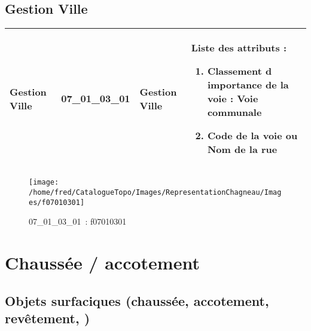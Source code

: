 \documentclass[12pt,titlepage]{book}
\begin{document}
\subsection{Gestion Ville}
\noindent
\vspace{\baselineskip}

\renewcommand{\arraystretch}{1.2}
\begin{supertabular}{|p{10cm}|c|p{13cm}|p{12cm}|}
 Gestion Ville & 07\_01\_03\_01 & Gestion Ville & Liste des attributs :
\begin{enumerate}
  \item Classement d importance de la voie : Voie communale  \item Code de la voie ou Nom de la rue\end{enumerate}
\\
\hline
\end{supertabular}
\begin{figure}[h!]
  \hfill         %
  \begin{minipage}[t]{3cm}
    \begin{center}
      \texttt{[image: /home/fred/CatalogueTopo/Images/RepresentationChagneau/Images/f07010301]}
      \caption[~07\_01\_03\_01]{\small{07\_01\_03\_01~:} \tiny{f07010301}}\label{f07010301}
    \end{center}
  \end{minipage}
\end{figure}

\section{\large Chaussée / accotement}
\subsection{Objets surfaciques (chaussée, accotement, revêtement, )}
\noindent
\vspace{\baselineskip}
\end{document}
